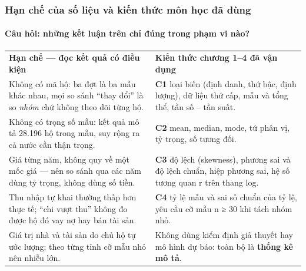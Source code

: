 \documentclass[aspectratio=169,10pt,t]{beamer}
\newcommand{\ask}[1]{{\color{ink2}Câu hỏi: #1}}
\begin{document}
\begin{frame}\frametitle{Hạn chế của số liệu và kiến thức môn học đã dùng}
\framesubtitle{\ask{những kết luận trên chỉ đúng trong phạm vi nào?}}
\vspace{2pt}
\footnotesize
\begin{tabularx}{\textwidth}{@{}L{0.47\textwidth}X@{}}
\textbf{Hạn chế — đọc kết quả có điều kiện} & \textbf{Kiến thức chương 1–4 đã vận dụng}\\
Không có mã hộ: ba đợt là ba mẫu khác nhau, mọi so sánh “thay đổi” là so \emph{nhóm} chứ không theo dõi từng hộ. & \textbf{C1} loại biến (định danh, thứ bậc, định lượng), dữ liệu thứ cấp, mẫu và tổng thể, tần số – tần suất.\\
Không có trọng số mẫu: kết quả mô tả 28.196 hộ trong mẫu, suy rộng ra cả nước cần thận trọng. & \textbf{C2} mean, median, mode, tứ phân vị, tỷ trọng, số tương đối.\\
Giá từng năm, không quy về một mốc giá — nên so sánh qua các năm dùng tỷ trọng, không dùng số tiền. & \textbf{C3} độ lệch (skewness), phương sai và độ lệch chuẩn, hiệp phương sai, hệ số tương quan r trên thang log.\\
Thu nhập tự khai thường thấp hơn thực tế; “chi vượt thu” không đo được hộ đó vay nợ hay bán tài sản. & \textbf{C4} tỷ lệ mẫu và sai số chuẩn của tỷ lệ, yêu cầu cỡ mẫu n ≥ 30 khi tách nhóm nhỏ.\\
Giá trị nhà và tài sản do chủ hộ tự ước lượng; theo từng tỉnh cỡ mẫu nhỏ nên nhiễu lớn. & Không dùng kiểm định giả thuyết hay mô hình dự báo: toàn bộ là \textbf{thống kê mô tả}.\\
\bottomrule
\end{tabularx}
\normalsize
\end{frame}
\end{document}
